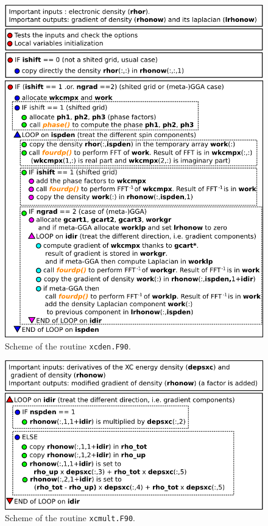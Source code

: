 \documentclass[a4paper,12pt]{report}
\begin{document}
\begin{figure}[!ht]
	\centering
	\includegraphics[width=\textwidth]{xcden}
	\caption{Scheme of the routine \texttt{xcden.F90}.}
	\label{figxcden}
\end{figure}

\begin{figure}[!ht]
	\centering
	\includegraphics[width=\textwidth]{xcmult}
	\caption{Scheme of the routine \texttt{xcmult.F90}.}
	\label{figxcmult}
\end{figure}
\end{document}
